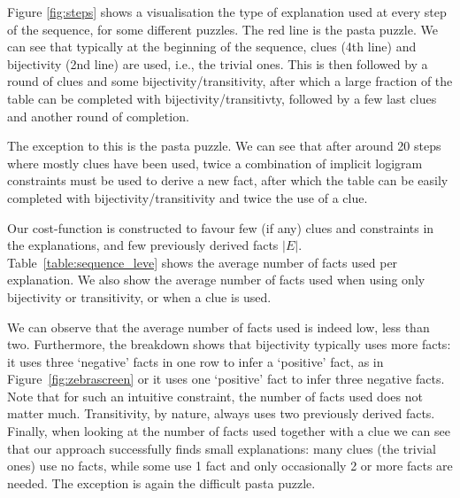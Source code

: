Figure \ref{fig:steps} shows a visualisation the type of explanation used at every step of the sequence, for some different puzzles.
The red line is the pasta puzzle.
We can see that typically at the beginning of the sequence, clues (4th line) and bijectivity (2nd line) are used, i.e., the trivial ones.
This is then followed by a round of clues and some bijectivity/transitivity, after which a large fraction of the table can be completed with bijectivity/transitivty, followed by a few last clues and another round of completion.

The exception to this is the pasta puzzle.
We can see that after around 20 steps where mostly clues have been used, twice a combination of implicit logigram constraints must be used to derive a new fact, after which the table can be easily completed with bijectivity/transitivity and twice the use of a clue.


Our cost-function is constructed to favour few (if any) clues and constraints in the explanations, and few previously derived facts $|E|$.
Table~\ref{table:sequence_leve} shows the average number of facts used per explanation. We also show the average number of facts used when using only bijectivity or transitivity, or when a clue is used.

We can observe that the average number of facts used is indeed low, less than two.
Furthermore, the breakdown shows that bijectivity typically uses more facts: it uses three `negative' facts in one row to infer a `positive' fact, as in Figure~\ref{fig:zebrascreen} or it uses one `positive' fact to infer three negative facts.
Note that for such an intuitive constraint, the number of facts used does not matter much.
Transitivity, by nature, always uses two previously derived facts.
Finally, when looking at the number of facts used together with a clue we can see that our approach successfully finds small explanations: many clues (the trivial ones) use no facts, while some use 1 fact and only occasionally 2 or more facts are needed.
The exception is again the difficult pasta puzzle.


